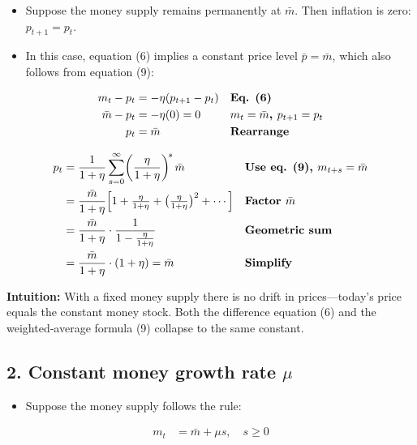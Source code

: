 \documentclass[12pt]{article}
\begin{document}
\begin{itemize}
    \item Suppose the money supply remains permanently at $\bar m$. Then inflation is zero: $p_{t+1}=p_t$.  
    \item In this case, equation (6) implies a constant price level $\bar p=\bar m$, which also follows from equation (9):  
\end{itemize}

\singlespacing
\begin{align}
m_t - p_t &= -\eta(p_{t+1}-p_t) && \text{\textbf{Eq. (6)}} \\
\bar m - p_t &= -\eta(0) = 0 && \text{\textbf{$m_t=\bar m$, $p_{t+1}=p_t$}} \\
p_t &= \bar m && \text{\textbf{Rearrange}}
\end{align}

\singlespacing
\begin{align}
p_t &= \frac{1}{1+\eta}\sum_{s=0}^{\infty}\!\left(\frac{\eta}{1+\eta}\right)^{\!s}\bar m && \text{\textbf{Use eq. (9), $m_{t+s}=\bar m$}} \\
    &= \frac{\bar m}{1+\eta}\Big[1+\tfrac{\eta}{1+\eta}+\big(\tfrac{\eta}{1+\eta}\big)^2+\cdots\Big] && \text{\textbf{Factor $\bar m$}} \\
    &= \frac{\bar m}{1+\eta}\cdot \frac{1}{1-\frac{\eta}{1+\eta}} && \text{\textbf{Geometric sum}} \\
    &= \frac{\bar m}{1+\eta}\cdot(1+\eta) = \bar m && \text{\textbf{Simplify}}
\end{align}

\textbf{Intuition:} With a fixed money supply there is no drift in prices—today’s price equals the constant money stock. Both the difference equation (6) and the weighted‐average formula (9) collapse to the same constant.

\subsection*{\noindent\textbf{2. Constant money growth rate $\mu$}}

\begin{itemize}
    \item Suppose the money supply follows the rule:
\end{itemize}

\singlespacing
\begin{align}
m_t &= \bar{m} + \mu s, \quad s \geq 0
\end{align}
\end{document}

